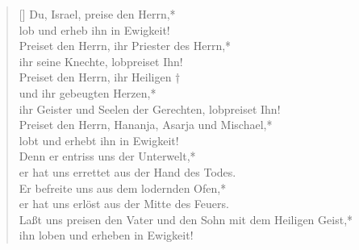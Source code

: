 \begin{verse}[\versewidth]
Du, Israel, preise den Herrn,*\\
lob und erheb ihn in Ewigkeit!\\
\vin Preiset den Herrn, ihr Priester des Herrn,*\\
\vin ihr seine Knechte, lobpreiset Ihn!\\
Preiset den Herrn, ihr Heiligen †\\
und ihr gebeugten Herzen,*\\
ihr Geister und Seelen der Gerechten, lobpreiset Ihn!\\

\vin Preiset den Herrn, Hananja, Asarja und Mischael,*\\
\vin lobt und erhebt ihn in Ewigkeit!\\
Denn er entriss uns der Unterwelt,*\\
er hat uns errettet aus der Hand des Todes.\\
\vin Er befreite uns aus dem lodernden Ofen,*\\
\vin er hat uns erlöst aus der Mitte des Feuers.\\

Laßt uns preisen den Vater und den Sohn
mit dem Heiligen Geist,*\\
ihn loben und erheben in Ewigkeit!\\

\end{verse}


\vspace{0.6cm}




